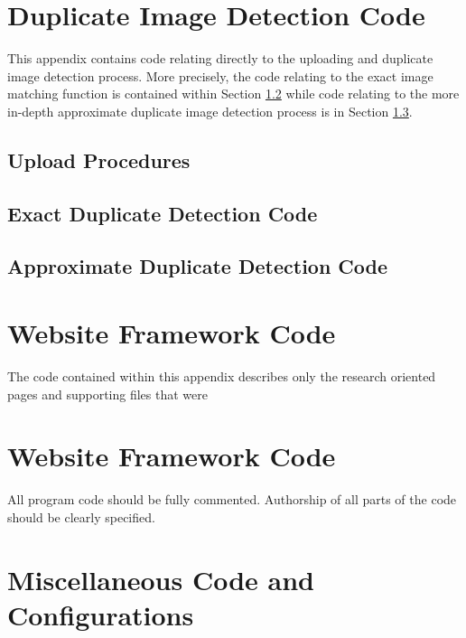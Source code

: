 %
%
\lstset{language=PHP, frame=none}

\chapter{Duplicate Image Detection Code}\label{appa:didcode}
This appendix contains code relating directly to the uploading and duplicate image detection process. More precisely, the code relating to the exact image matching function is contained within Section \ref{appa:exact} while code relating to the more in-depth approximate duplicate image detection process is in Section \ref{appa:approx}.

\section{Upload Procedures}\label{appa:upload}


\section{Exact Duplicate Detection Code}\label{appa:exact}


\section{Approximate Duplicate Detection Code}\label{appa:approx}



\chapter{Website Framework Code}\label{appb:wejbcode}
The code contained within this appendix describes only the research oriented
pages and supporting files that were 


%

\chapter{Website Framework Code}\label{appb:webcode}
All program code should be fully commented. Authorship
of all parts of the code should be clearly specified. 

\chapter{Miscellaneous Code and Configurations}\label{appc:misccode}
